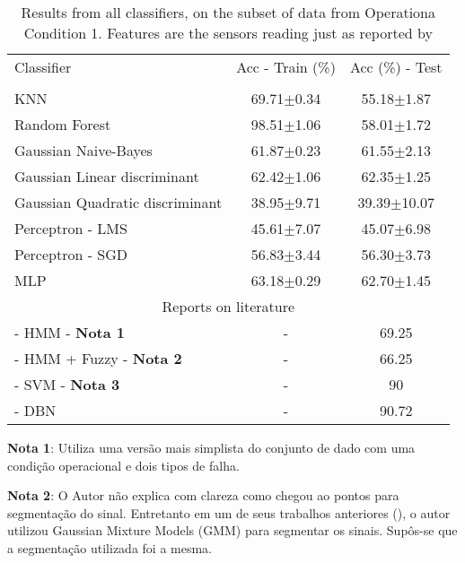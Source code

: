 \documentclass[review]{elsarticle}
\begin{document}
\begin{table}[H]
\caption{Results from all classifiers, on the subset of data from Operationa Condition 1. Features are the sensors reading just as reported by \cite{wang2008similarity}}
\centering

\begin{tabular}{lcc}
\toprule
\hline
Classifier   & Acc - Train (\%)  & Acc (\%) - Test\\ 
                      \\ \hline \hline 
KNN      			& 69.71$\pm$0.34 & 55.18$\pm$1.87 \\  
Random Forest        & 98.51$\pm$1.06 & 58.01$\pm$1.72 \\
Gaussian Naive-Bayes         & 61.87$\pm$0.23 & 61.55$\pm$2.13 \\
Gaussian Linear discriminant & 62.42$\pm$1.06 & 62.35$\pm$1.25 \\
Gaussian Quadratic discriminant & 38.95$\pm$9.71 & 39.39$\pm$10.07 \\
Perceptron - LMS & 45.61$\pm$7.07 & 45.07$\pm$6.98 \\
Perceptron - SGD & 56.83$\pm$3.44 & 56.30$\pm$3.73 \\
MLP & 63.18$\pm$0.29  & 62.70$\pm$1.45 \\
\hline
\hline
\multicolumn{3}{c}{Reports on literature} \\
\hline
\hline
\cite{ramasso2009contribution} - HMM - \textbf{Nota 1}& -  & 69.25\\
\cite{ramasso2010prognostics} - HMM + Fuzzy - \textbf{Nota 2} & -  & 66.25\\
\cite{zhao2011comparison} - SVM - \textbf{Nota 3} & -  & 90\\
\cite{tamilselvan2013failure} - DBN & -  & 90.72 \\
\hline \hline

\bottomrule
\end{tabular}
\label{tab:clf_all}
\end{table}

\textbf{Nota 1}: Utiliza uma versão mais simplista do conjunto de dado com uma condição operacional e dois tipos de falha.

\textbf{Nota 2}: O Autor não explica com clareza como chegou ao pontos para segmentação do sinal. Entretanto em um de seus trabalhos anteriores (\cite{ramasso2009contribution}), o autor utilizou Gaussian Mixture Models (GMM) para segmentar os sinais. Supôs-se que a segmentação utilizada foi a mesma.
\end{document}
